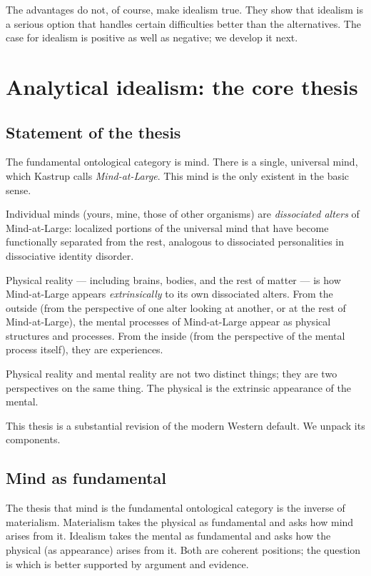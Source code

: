 The advantages do not, of course, make idealism true. They show that
idealism is a serious option that handles certain difficulties
better than the alternatives. The case for idealism is positive as
well as negative; we develop it next.

\section{Analytical idealism: the core thesis}
\label{sec:analytical-idealism-core}

\subsection{Statement of the thesis}

\begin{conceptbox}
\label{conc:analytical-idealism}
The fundamental ontological category is mind. There is a single,
universal mind, which Kastrup calls \emph{Mind-at-Large}. This mind
is the only existent in the basic sense.

Individual minds (yours, mine, those of other organisms) are
\emph{dissociated alters} of Mind-at-Large: localized portions of
the universal mind that have become functionally separated from the
rest, analogous to dissociated personalities in dissociative
identity disorder.

Physical reality --- including brains, bodies, and the rest of
matter --- is how Mind-at-Large appears \emph{extrinsically} to its
own dissociated alters. From the outside (from the perspective of
one alter looking at another, or at the rest of Mind-at-Large), the
mental processes of Mind-at-Large appear as physical structures and
processes. From the inside (from the perspective of the mental
process itself), they are experiences.

Physical reality and mental reality are not two distinct things;
they are two perspectives on the same thing. The physical is the
extrinsic appearance of the mental.
\end{conceptbox}

This thesis is a substantial revision of the modern Western default.
We unpack its components.

\subsection{Mind as fundamental}

The thesis that mind is the fundamental ontological category is the
inverse of materialism. Materialism takes the physical as
fundamental and asks how mind arises from it. Idealism takes the
mental as fundamental and asks how the physical (as appearance)
arises from it. Both are coherent positions; the question is which
is better supported by argument and evidence.


